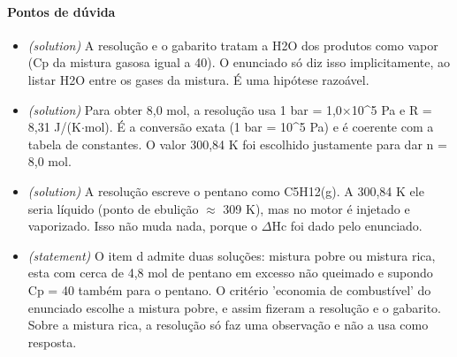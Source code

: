 \documentclass{article}%
\begin{document}
\paragraph{Pontos de dúvida}%
\begin{itemize}%
\item%
\textit{(solution)} A resolução e o gabarito tratam a H2O dos produtos como vapor (Cp da mistura gasosa igual a 40). O enunciado só diz isso implicitamente, ao listar H2O entre os gases da mistura. É uma hipótese razoável.%
\item%
\textit{(solution)} Para obter 8,0 mol, a resolução usa 1 bar = 1,0$\times$10\^{}5 Pa e R = 8,31 J/(K$\cdot$mol). É a conversão exata (1 bar = 10\^{}5 Pa) e é coerente com a tabela de constantes. O valor 300,84 K foi escolhido justamente para dar n = 8,0 mol.%
\item%
\textit{(solution)} A resolução escreve o pentano como C5H12(g). A 300,84 K ele seria líquido (ponto de ebulição $\approx$ 309 K), mas no motor é injetado e vaporizado. Isso não muda nada, porque o $\Delta$Hc foi dado pelo enunciado.%
\item%
\textit{(statement)} O item d admite duas soluções: mistura pobre ou mistura rica, esta com cerca de 4,8 mol de pentano em excesso não queimado e supondo Cp = 40 também para o pentano. O critério 'economia de combustível' do enunciado escolhe a mistura pobre, e assim fizeram a resolução e o gabarito. Sobre a mistura rica, a resolução só faz uma observação e não a usa como resposta.%
\end{itemize}%
\end{document}
